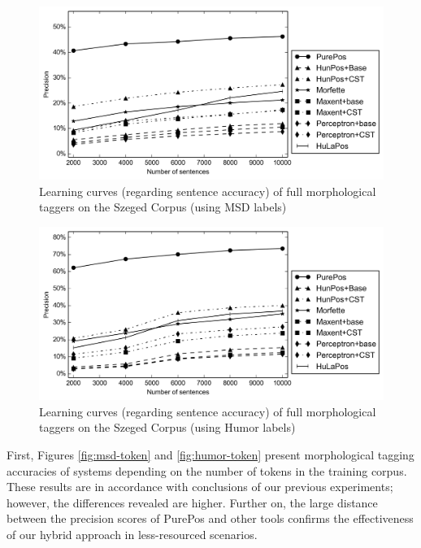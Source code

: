 \begin{figure}[H]
  \centering
  \includegraphics[width=1\textwidth]{MorphTagging/msd_sent.png} 
  \caption{Learning curves (regarding sentence accuracy) of full morphological taggers on the Szeged Corpus (using MSD labels)}
  \label{fig:msd-sent}
\end{figure}

\begin{figure}[H]
  \centering
  \includegraphics[width=1\textwidth]{MorphTagging/humor_sent.png}
  \caption{Learning curves (regarding sentence accuracy) of full morphological taggers on the Szeged Corpus (using Humor labels)}
  \label{fig:humor-sent}
\end{figure}

First, Figures \ref{fig:msd-token} and \ref{fig:humor-token} present morphological tagging accuracies of systems depending on the number of tokens in the training corpus. 
These results are in accordance with conclusions of our previous experiments; however, the differences revealed are higher. 
Further on, the large distance between the precision scores of PurePos and other tools confirms the effectiveness of our  hybrid approach in less-resourced scenarios.


